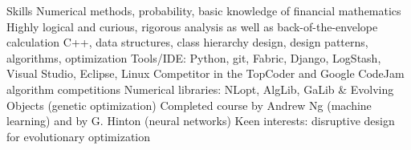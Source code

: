 \begin{rubric}{Skills}
\entry*[]%
Numerical methods, probability, basic knowledge of financial mathematics
\entry*[]%
Highly logical and curious, rigorous analysis as well as back-of-the-envelope calculation
%
%
\entry*[]%
C++, data structures, class hierarchy design, design patterns, algorithms, optimization
\entry*[]%
Tools/IDE: Python, git, Fabric, Django, LogStash, Visual Studio, Eclipse, Linux
\entry*[]%
Competitor in the TopCoder and Google CodeJam algorithm competitions
%
%
\entry*[]%
Numerical libraries: NLopt, AlgLib, GaLib \& Evolving Objects (genetic optimization)
\entry*[]%
Completed course by Andrew Ng (machine learning) and by G. Hinton (neural networks)
\entry*[]%
Keen interests: disruptive design for evolutionary optimization
%
%
\end{rubric}
